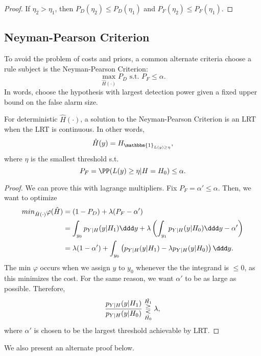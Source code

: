 \begin{proof}
If $\eta_2 > \eta_1$, then $P_D(\eta_2)\leq P_D(\eta_1)$ and $P_F(\eta_2)\leq P_F(\eta_1)$.
\end{proof}

\subsection{Neyman-Pearson Criterion}

To avoid the problem of costs and priors, a common alternate criteria choose a rule subject is the \ac{Neyman-Pearson Criterion}: 
\[\max_{\hat{H}(\cdot)}P_D \text{ s.t. }P_F\leq \alpha.\] 
In words, choose the hypothesis with largest detection power given a fixed upper bound on the false alarm size.
\begin{theorem}

For deterministic $\hat{H}(\cdot)$, a solution to the Neyman-Pearson Criterion is an LRT when the LRT is continuous. In other words, 
\[\hat{H}(y) = H_{\mathbbm{1}_{L(y)\geq \eta}},\] 
where $\eta$ is the smallest threshold s.t. 
\[P_F = \PP(L(y)\geq \eta | H=H_0)\leq \alpha.\] 
\end{theorem}

\begin{proof}
We can prove this with lagrange multipliers. Fix $P_F = \alpha' \leq \alpha$. Then, we want to optimize
\begin{align*}
	min_{\hat{H}(\cdot)} \varphi(\hat{H}) &= (1-P_D) + \lambda(P_F-\alpha') \\
	&= \int_{y_0}p_{Y|H}(y|H_1)\ddd y + \lambda \left( \int_{y_1}p_{Y|H}(y|H_0)\ddd y - \alpha' \right) \\
	&= \lambda(1-\alpha') + \int_{y_0}\left(p_{Y|H}(y|H_1) - \lambda p_{Y|H}(y|H_0)\right) \ddd y.
\end{align*}
The min $\varphi$ occurs when we assign $y$ to $y_0$ whenever the the integrand is $\leq 0$, as this minimizes the cost. For the same reason, we want $\alpha'$ to be as large as possible. Therefore, 
\[\frac{p_{Y|H}(y|H_1)}{p_{Y|H}(y|H_0)}\overunderset{\hat{H_1}}{\hat{H_0}}{\gtreqless}\lambda,\]
where $\alpha'$ is chosen to be the largest threshold achievable by LRT. 
\end{proof}

\noindent We also present an alternate proof below.

